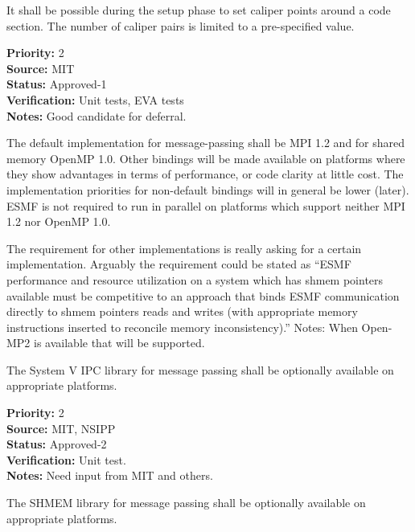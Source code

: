 
It shall be possible during the setup phase to set caliper points
around a code section.  The number of
caliper pairs is limited to a pre-specified value.

\begin{reqlist}
{\bf Priority:} 2 \\
{\bf Source:}  MIT \\
{\bf Status:} Approved-1 \\
{\bf Verification:} Unit tests, EVA tests \\
{\bf Notes:} Good candidate for deferral.
\end{reqlist}



The default implementation for message-passing shall be MPI 1.2 and for
shared memory OpenMP 1.0.  Other bindings will be made available on
platforms where they show advantages in terms of performance, or code
clarity at little cost. The implementation priorities for non-default
bindings will in general be lower (later). ESMF is not required to run
in parallel on platforms which support neither MPI 1.2 nor OpenMP 1.0.

The requirement for other implementations is really asking for a certain
implementation. Arguably the requirement could be stated as ``ESMF
performance and resource utilization on a system which has shmem
pointers available must be competitive to an approach that binds ESMF
communication directly to shmem pointers reads and writes (with
appropriate memory instructions inserted to reconcile memory
inconsistency).''
Notes:  When Open-MP2 is available that will be supported.


The System V IPC library for message passing shall be optionally
available on appropriate platforms.

\begin{reqlist}
{\bf Priority:} 2 \\
{\bf Source:}  MIT, NSIPP \\
{\bf Status:} Approved-2 \\
{\bf Verification:} Unit test. \\
{\bf Notes:} Need input from MIT and others.
\end{reqlist}


The SHMEM library for message passing shall be optionally
available on appropriate platforms.

